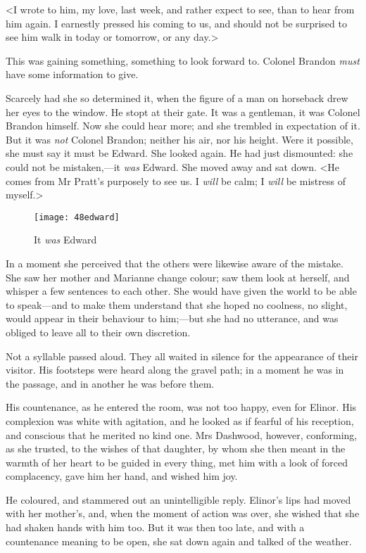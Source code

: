 <I wrote to him, my love, last week, and rather expect to see, than to hear from him again. I earnestly pressed his coming to us, and should not be surprised to see him walk in today or tomorrow, or any day.>

This was gaining something, something to look forward to. Colonel Brandon \textit{must} have some information to give.

Scarcely had she so determined it, when the figure of a man on horseback drew her eyes to the window. He stopt at their gate. It was a gentleman, it was Colonel Brandon himself. Now she could hear more; and she trembled in expectation of it. But it was \textit{not} Colonel Brandon; neither his air, nor his height. Were it possible, she must say it must be Edward. She looked again. He had just dismounted: she could not be mistaken,—it \textit{was} Edward. She moved away and sat down. <He comes from Mr Pratt's purposely to see us. I \textit{will} be calm; I \textit{will} be mistress of myself.>

\begin{figure}[tbph]
\centering
\texttt{[image: 48edward]}
\caption{It \textit{was} Edward}
\end{figure}

In a moment she perceived that the others were likewise aware of the mistake. She saw her mother and Marianne change colour; saw them look at herself, and whisper a few sentences to each other. She would have given the world to be able to speak—and to make them understand that she hoped no coolness, no slight, would appear in their behaviour to him;—but she had no utterance, and was obliged to leave all to their own discretion.

Not a syllable passed aloud. They all waited in silence for the appearance of their visitor. His footsteps were heard along the gravel path; in a moment he was in the passage, and in another he was before them.

His countenance, as he entered the room, was not too happy, even for Elinor. His complexion was white with agitation, and he looked as if fearful of his reception, and conscious that he merited no kind one. Mrs Dashwood, however, conforming, as she trusted, to the wishes of that daughter, by whom she then meant in the warmth of her heart to be guided in every thing, met him with a look of forced complacency, gave him her hand, and wished him joy.

He coloured, and stammered out an unintelligible reply. Elinor's lips had moved with her mother's, and, when the moment of action was over, she wished that she had shaken hands with him too. But it was then too late, and with a countenance meaning to be open, she sat down again and talked of the weather.

